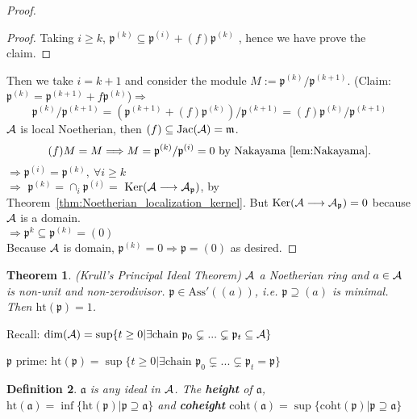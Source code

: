 \documentclass[11pt]{article}
\newtheorem{thm}{Theorem}[section]
\newtheorem{dfn}[thm]{Definition}
\newcommand{\sca}{{\mathfrak a}}
\newcommand{\scm}{{\mathfrak m}}
\newcommand{\scp}{{\mathfrak p}}
\newcommand{\cala}{{\cal A}}
\newcommand{\Lrta}{\Longrightarrow}
\newcommand{\lrta}{\longrightarrow}
\begin{document}
\begin{proof}
\begin{proof}
Taking $i\geq k$,
$
\scp^{(k)}\subseteq\scp^{(i)}+(f)\scp^{(k)}
$
, hence we have prove the claim.
\end{proof}

Then we take $i=k+1$ and consider the module $M:=\scp^{(k)}/\scp^{(k+1)}$.
(Claim:$\scp^{(k)}=\scp^{(k+1)}+f\scp^{(k)}$)$\Lrta$ 
$$
\scp^{(k)}/\scp^{(k+1)}=(\scp^{(k+1)}+(f)\scp^{(k)})/\scp^{(k+1)}=(f)\scp^{(k)}/\scp^{(k+1)}
$$
$\cala$ is local Noetherian, then
$(f)\subseteq \text{Jac}(\cala)=\scm$.
$$
(f)M=M\Lrta M=\scp^{(k)}/\scp^{(i)}=0\text{ by Nakayama~\ref{lem:Nakayama}}.\\
$$
$\Lrta\scp^{(i)}=\scp^{(k)},\ \forall i\geq k$\\
$\Lrta$ $\scp^{(k)}=\cap_i\scp^{(i)}=$  $\text{Ker}(\cala\lrta \cala_\scp)$, by Theorem~\ref{thm:Noetherian_localization_kernel}. 
But $\text{Ker}(\cala\lrta \cala_\scp)={0}$ because $\cala$ is a domain.\\
$\Lrta \scp^k\subseteq\scp^{(k)}=(0)$\\
Because $\cala$ is domain, $\scp^{(k)}=0\Lrta\scp=(0)$ as desired.
\end{proof}

\begin{thm}\label{thm:krull_principal}
(Krull's Principal Ideal Theorem) $\cala$ a Noetherian ring and $a\in \cala$ is non-unit and non-zerodivisor.
$\scp\in \text{Ass}'((a))$, i.e. $\scp\supseteq (a)$ is minimal. Then $\text{ht}(\scp)=1$.
\end{thm}
Recall: $\text{dim}(\cala)=\sup\{t\geq 0|\exists \text{chain } \scp_0\subsetneq...\subsetneq \scp_t\subseteq \cala\}$

$\scp$ prime: $\text{ht}(\scp)=\sup\{t\geq 0|\exists \text{chain } \scp_0\subsetneq...\subsetneq \scp_t=\scp\}$
\begin{dfn}$\sca$ is any ideal in $\cala$. The \textbf{height} of $\sca$, $\text{ht}(\sca)=\inf\{\text{ht}(\scp)|\scp\supseteq\sca\}$
 and \textbf{coheight} $\text{coht}(\sca)=\sup\{\text{coht}(\scp)|\scp\supseteq \sca\}$
\end{dfn}
\end{document}
